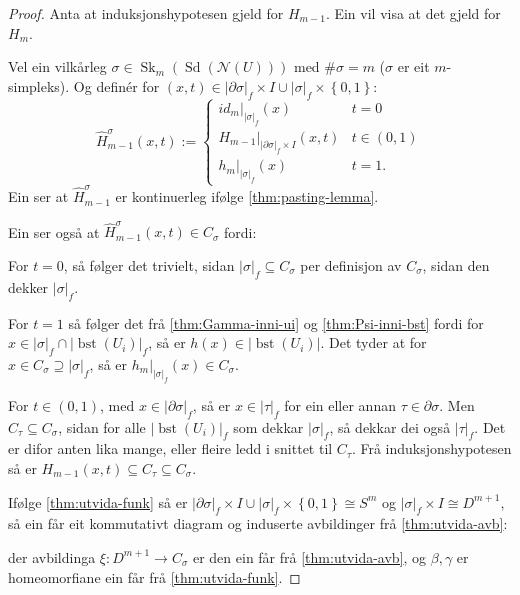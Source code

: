 \documentclass[a4paper, 12pt, norsk]{article}
\theoremstyle{plain}
\theoremstyle{definition}
\newcommand{\Nc}{\mathcal{N}}
\newcommand{\intersect}{ \mathop{\cap}\limits }
\newcommand{\union}{ \mathop{\cup}\limits }
\newcommand{\gr}[1]{ \lvert #1 \rvert } %
\newcommand{\set}[1]{ \left\{ #1 \right\} } %
\DeclareMathOperator{\Sd}{Sd} %
\DeclareMathOperator{\bst}{bst} %
\DeclareMathOperator{\Sk}{Sk} %
\begin{document}
\begin{proof}
	Anta at induksjonshypotesen gjeld for \( H_{m-1} \). Ein vil visa at det gjeld for \( H_m \).

	Vel ein vilkårleg \( \sigma \in \Sk_m(\Sd(\Nc(U))) \) med \( \#\sigma = m \) (\( \sigma \) er eit \( m \)-simpleks). Og definér for \( (x, t) \in \gr{\partial\sigma}_f \times I \union \gr{\sigma}_f \times \set{0, 1} \):
	\[
		\hat{H}_{m-1}^\sigma (x,t) := 
		\begin{cases}
			id_m|_{\gr{\sigma}_f}(x) & t=0 \\
			H_{m-1}|_{\gr{\partial\sigma}_f \times I}(x,t) & t \in (0, 1) \\
			h_m|_{\gr{\sigma}_f}(x) & t=1.
		\end{cases}
	\]
	Ein ser at \( \hat{H}_{m-1}^\sigma \) er kontinuerleg ifølge \autoref{thm:pasting-lemma}.
	
	Ein ser også at \( \hat{H}_{m-1}^\sigma (x,t) \in C_\sigma \) fordi: 
	
	For \( t = 0 \), så følger det trivielt, sidan \( \gr{\sigma}_f \subseteq C_\sigma \) per definisjon av \( C_\sigma \), sidan den dekker \( \gr{\sigma}_f \).
	
	For \( t = 1 \) så følger det frå \autoref{thm:Gamma-inni-ui} og \autoref{thm:Psi-inni-bst} fordi for \( x \in \gr{\sigma}_f \intersect \gr{\bst(U_i)}_f \), så er \( h(x) \in \gr{\bst(U_i)} \). Det tyder at for \( x \in C_\sigma \supseteq \gr{\sigma}_f \), så er \( h_m|_{\gr{\sigma}_f}(x) \in C_\sigma \). 
	
	For \( t \in (0, 1) \), med \( x \in \gr{\partial\sigma}_f \), så er \( x \in \gr{\tau}_f \) for ein eller annan \( \tau \in \partial\sigma \). Men \( C_\tau \subseteq C_\sigma \), sidan for alle \( \gr{\bst(U_i)}_f \) som dekkar \( \gr{\sigma}_f \), så dekkar dei også \( \gr{\tau}_f \). Det er difor anten lika mange, eller fleire ledd i snittet til \( C_\tau \). Frå induksjonshypotesen så er \( H_{m-1}(x, t) \subseteq C_{\tau} \subseteq C_\sigma \).

	Ifølge \autoref{thm:utvida-funk} så er \( \gr{\partial\sigma}_f \times I \union \gr{\sigma}_f \times \set{0, 1} \cong S^{m} \) og \( \gr{\sigma}_f \times I \cong D^{m+1} \), så ein får eit kommutativt diagram og induserte avbildinger frå \autoref{thm:utvida-avb}:

	\begin{center}
	\end{center}
	der avbildinga \( \xi: D^{m+1} \to C_\sigma \) er den ein får frå \autoref{thm:utvida-avb}, og \( \beta, \gamma \) er homeomorfiane ein får frå \autoref{thm:utvida-funk}.


\end{proof}
\end{document}
